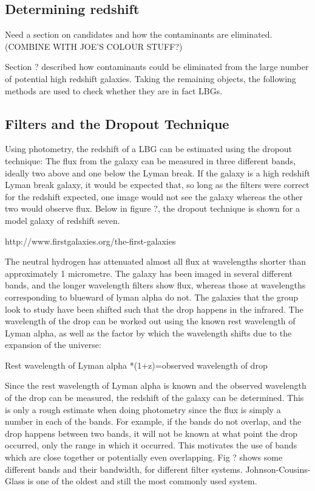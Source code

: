 \subsection{Determining redshift}

Need a section on candidates and how the contaminants are eliminated.
(COMBINE WITH JOE’S COLOUR STUFF?)

Section ? described how contaminants could be eliminated from the large number of potential high redshift galaxies. Taking the remaining objects, the following methods are used to check whether they are in fact LBGs.

\subsection{Filters and the Dropout Technique}

Using photometry, the redshift of a LBG can be estimated using the dropout technique: The flux from the galaxy can be measured in three different bands, ideally two above and one below the Lyman break. If the galaxy is a high redshift Lyman break galaxy, it would be expected that, so long as the filters were correct for the redshift expected, one image would not see the galaxy whereas the other two would observe flux. Below in figure ?, the dropout technique is shown for a model galaxy of redshift seven.

http://www.firstgalaxies.org/the-first-galaxies

The neutral hydrogen has attenuated almost all flux at wavelengths shorter than approximately 1 micrometre. The galaxy has been imaged in several different bands, and the longer wavelength filters show flux, whereas those at wavelengths corresponding to blueward of lyman alpha do not. The galaxies that the group look to study have been shifted such that the drop happens in the infrared. The wavelength of the drop can be worked out using the known rest wavelength of Lyman alpha, as well as the factor by which the wavelength shifts due to the expansion of the universe:

Rest wavelength of Lyman alpha *(1+z)=observed wavelength of drop

Since the rest wavelength of Lyman alpha is known and the observed wavelength of the drop can be measured, the redshift of the galaxy can be determined. This
is only a rough estimate when doing photometry since the flux is simply a number in each of the bands. For example, if the bands do not overlap, and the drop happens between two bands, it will not be known at what point the drop occurred, only the range in which it occurred. This motivates the use of bands which are close together or potentially even overlapping. Fig ? shows some different bands and their bandwidth, for different filter systems. Johnson-Cousins- Glass is one of the oldest and still the most commonly used system.

